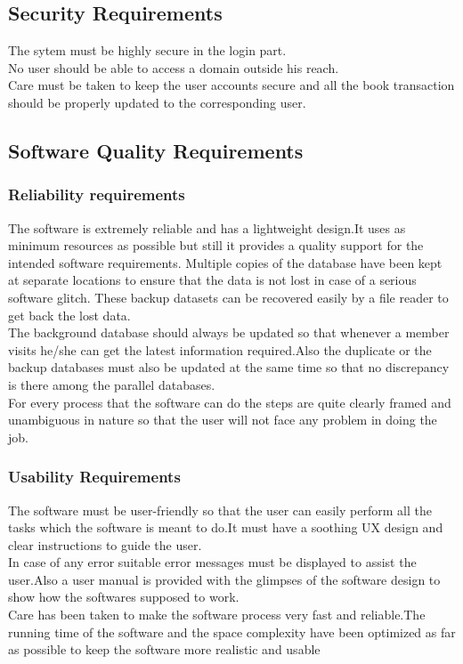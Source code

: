 \documentclass{article}
\begin{document}
\subsection{Security Requirements}
The sytem must be highly secure in the login part.\\
No user should be able to access a domain outside his reach.\\
Care must be taken to keep the user accounts secure and all the book transaction should be properly updated to the corresponding user.\\

\subsection{Software Quality Requirements}
\subsubsection{Reliability requirements}
The software is extremely reliable and has a lightweight design.It uses as minimum resources as possible but still it provides a quality support for the intended software requirements.
Multiple copies of the database have been kept at separate locations to ensure that the data is not lost in case of a serious software glitch. These backup datasets can be recovered easily by a file reader to get back the lost data.
\\
The background database should always be updated so that whenever a member visits he/she can get the latest information required.Also the duplicate or the backup databases must also be updated at the same time so that no discrepancy is there among the parallel databases.
\\
For every process that the software can do the steps are quite clearly framed and unambiguous in nature so that the user will not face any problem in doing the job.
\subsubsection{Usability Requirements}
The software must be user-friendly so that the user can easily perform all the tasks which the software is meant to do.It must have a soothing UX design and clear instructions to guide the user.
\\In case of any error suitable error messages must be displayed to assist the user.Also a user manual is provided with the glimpses of the software design to show how the softwares supposed to work.
\\
Care has been taken to make the software process very fast and reliable.The running time of the software and the space complexity have been optimized as far as possible to keep the software more realistic and usable
\end{document}
